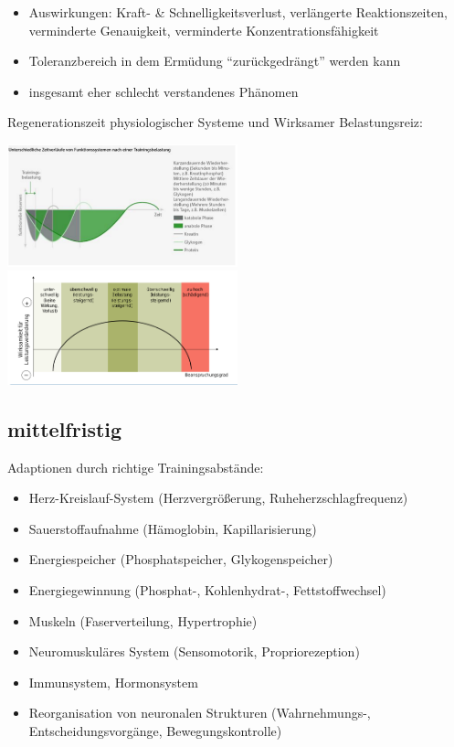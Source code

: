 \begin{itemize}
    \item Auswirkungen: Kraft- \& Schnelligkeitsverlust, verlängerte Reaktionszeiten, verminderte Genauigkeit, verminderte Konzentrationsfähigkeit
    \item  Toleranzbereich in dem Ermüdung ``zurückgedrängt'' werden kann
    \item insgesamt eher schlecht verstandenes Phänomen
\end{itemize}

Regenerationszeit physiologischer Systeme und Wirksamer Belastungsreiz:

\includegraphics[width=0.5\textwidth]{pictures/regenerationszeit}
\includegraphics[width=0.5\textwidth]{pictures/belastungsreiz}

\subsection{mittelfristig}

Adaptionen durch richtige Trainingsabstände:
\begin{itemize}
    \item Herz-Kreislauf-System (Herzvergrößerung, Ruheherzschlagfrequenz)
    \item Sauerstoffaufnahme (Hämoglobin, Kapillarisierung)
    \item Energiespeicher (Phosphatspeicher, Glykogenspeicher)
    \item Energiegewinnung (Phosphat-, Kohlenhydrat-, Fettstoffwechsel)
    \item Muskeln (Faserverteilung, Hypertrophie)
    \item Neuromuskuläres System (Sensomotorik, Propriorezeption)
    \item Immunsystem, Hormonsystem
    \item Reorganisation von neuronalen Strukturen (Wahrnehmungs-, Entscheidungsvorgänge, Bewegungskontrolle)
\end{itemize}

